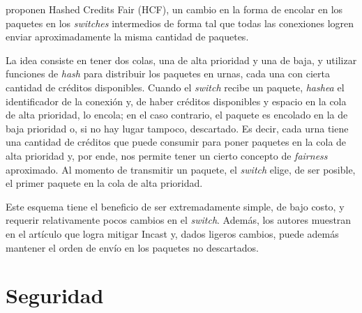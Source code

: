 \documentclass[runningheads,a4paper]{llncs}
\begin{document}
\citet{Shpiner_HCF_2010} proponen Hashed Credits Fair (HCF), un cambio en la forma de encolar en los paquetes en los \textit{switches} intermedios de forma tal que todas las conexiones logren enviar aproximadamente la misma cantidad de paquetes.

La idea consiste en tener dos colas, una de alta prioridad y una de baja, y utilizar funciones de \textit{hash} para distribuir los paquetes en urnas, cada una con cierta cantidad de créditos disponibles. Cuando el \textit{switch} recibe un paquete, \textit{hashea} el identificador de la conexión y, de haber créditos disponibles y espacio en la cola de alta prioridad, lo encola; en el caso contrario, el paquete es encolado en la de baja prioridad o, si no hay lugar tampoco, descartado. Es decir, cada urna tiene una cantidad de créditos que puede consumir para poner paquetes en la cola de alta prioridad y, por ende, nos permite tener un cierto concepto de \textit{fairness} aproximado. Al momento de transmitir un paquete, el \textit{switch} elige, de ser posible, el primer paquete en la cola de alta prioridad.

Este esquema tiene el beneficio de ser extremadamente simple, de bajo costo, y requerir relativamente pocos cambios en el \textit{switch}. Además, los autores muestran en el artículo que logra mitigar Incast y, dados ligeros cambios, puede además mantener el orden de envío en los paquetes no descartados.






\newpage

\section{Seguridad}
\end{document}
